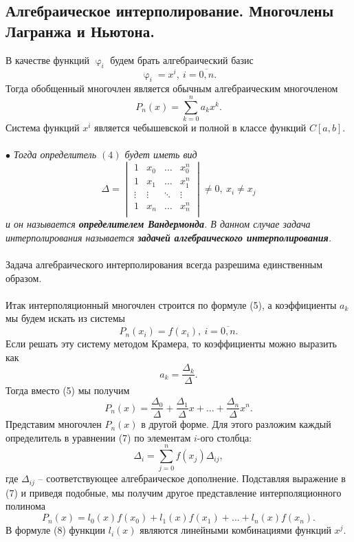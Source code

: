 \documentclass[a4paper, 12pt]{report}
\numberwithin{equation}{section}
\renewcommand{\varphi}{\upvarphi}
\begin{document}
	\subsection{Алгебраическое интерполирование. Многочлены Лагранжа и Ньютона.}
	В качестве функций $\varphi_i$ будем брать алгебраический базис $$\varphi_i = x^i,\ i=\overline{0,n}.$$
	Тогда обобщенный многочлен является обычным алгебраическим многочленом 
	\begin{equation}
		P_n(x) = \sum_{k=0}^{n}a_kx^k.
	\end{equation}
	Система функций $x^i$ является чебышевской и полной в классе функций $C[a,b]$. \\\\
	$\bullet$ \textit{Тогда определитель $(4)$ будет иметь вид} $$\Delta = \begin{vmatrix}
		1 & x_0 &\ldots &x_0^n\\
		1 & x_1 &\ldots & x_1^n\\
		\vdots & \vdots & \ddots & \vdots\\
		1 & x_n &\ldots & x_n^n\\
	\end{vmatrix}\ne 0,\ x _i \ne x_j$$ \textit{и он называется \textbf{определителем Вандермонда}. В данном случае задача интерполирования называется \textbf{задачей алгебраического интерполирования}.}\\\\
	Задача алгебраического интерполирования всегда разрешима единственным образом.\\\\
	Итак интерполяционный многочлен строится по формуле (5), а коэффициенты $a_k$ мы будем искать из системы \begin{equation}
		P_n(x_i) = f(x_i),\ i=\overline{0,n}.
	\end{equation}
	Если решать эту систему методом Крамера, то коэффициенты можно выразить как $$a_k = \dfrac{\Delta _k}{\Delta}.$$
	Тогда вместо (5) мы получим 
	\begin{equation}
		P_n(x) = \dfrac{\Delta_0}{\Delta} + \dfrac{\Delta_1}{\Delta}x +\ldots + \dfrac{\Delta_n}{\Delta}x^n.
	\end{equation}
	Представим многочлен $P_n(x)$ в другой форме. Для этого разложим каждый определитель в уравнении (7) по элементам $i$-ого столбца:
	$$\Delta _i = \sum_{j=0}^{n}f(x_j)\Delta_{ij},$$
	где $\Delta_{ij}$ -- соответствующее алгебраическое дополнение.
	Подставляя выражение в (7) и приведя подобные, мы получим другое представление интерполяционного полинома \begin{equation}
		P_n(x) = l_0(x)f(x_0) + l_1(x)f(x_1)+\ldots + l_n(x)f(x_n).
	\end{equation}
	В формуле (8) функции $l_i(x)$ являются линейными комбинациями функций $x^j$.
\end{document}
